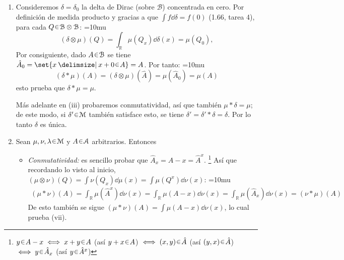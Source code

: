 \begin{sol}
\begin{enumerate}[label=(\roman*)]
{}
{\thickmuskip=10mu
\[
\abs{\mu*\nu} 
\leq {s_*(\mu^+ \otimes \nu^+)|_{\mathcal{B}}} + {s_*(\mu^- \otimes \nu^-)|_{\mathcal{B}}} + {s_*(\mu^+ \otimes \nu^-)|_{\mathcal{B}}} + s_*(\mu^- \otimes \nu^+)|_{\mathcal{B}}
\]}%
Al evaluar en $\mathbb{R}$ y aprovechar que $\hat{\mathbb{R}} = s^{-1}(\mathbb{R}) = \mathbb{R}\times\mathbb{R}$:
{\thickmuskip=10mu
\begin{align*}
\abs{\mu*\nu} (\mathbb{R})
&\leq (\mu^+\otimes\nu^+)(\mathbb{R}\times\mathbb{R}) + (\mu^-\otimes\nu^-)(\mathbb{R}\times\mathbb{R}) + (\mu^+\otimes\nu^-)(\mathbb{R}\times\mathbb{R}) + (\mu^-\otimes\nu^+)(\mathbb{R}\times\mathbb{R})\\
&= \mu^+(\hat{\mathbb{R}})\nu^+(\hat{\mathbb{R}}) + \mu^-(\hat{\mathbb{R}})\nu^-(\hat{\mathbb{R}}) + \mu^+(\hat{\mathbb{R}})\nu^-(\hat{\mathbb{R}}) + \mu^-(\hat{\mathbb{R}})\nu^+(\hat{\mathbb{R}})\\
&= (\mu^++\mu^-)(\mathbb{R})(\nu^++\nu^-)(\mathbb{R})
= \abs{\mu}(\mathbb{R})\abs{\nu}(\mathbb{R})
\end{align*}}%
es decir, $\norm{\mu*\nu} \le \norm{\mu}\norm{\nu}$.
\item %
Consideremos $\delta = \delta_0$ la delta de Dirac (sobre $\mathcal{B}$) concentrada en cero. Por definición de medida producto y gracias a que $\int f \dd{\delta} = f(0)$ (1.66, tarea 4), para cada $Q\en\mathcal{B}\otimes\mathcal{B}$:
{\thickmuskip=10mu
\[
(\delta\otimes\mu)(Q) 
= \int_{\mathbb{R}} \mu(Q_x) \dd{\delta(x)}
= \mu(Q_0),
\]}%
Por consiguiente, dado $A\en\mathcal{B}$ se tiene $\hat{A}_0 = \set{x \given x+0 \en A} = A$. Por tanto:
{\thickmuskip=10mu
\[
(\delta\ast\mu)(A) = (\delta\otimes\mu)(\hat{A}) = \mu(\hat{A}_0) = \mu(A)
\]}%
esto prueba que $\delta*\mu=\mu$.\par
Más adelante en (iii) probaremos conmutatividad, así que también $\mu*\delta = \mu$; de este modo, si $\delta'\en\mathcal{M}$ también satisface esto, se tiene $\delta'  = \delta' * \delta = \delta$. Por lo tanto $\delta$ es única.
\item %
Sean $\mu,\nu,\lambda\en\mathcal{M}$ y $A\en\mathcal{A}$ arbitrarios. Entonces
\begin{itemize}
\item\emph{Conmutatividad:} 
es sencillo probar que $\hat{A}_x = A-x = \hat{A}^x$.%
\footnote{
    $y\en A-x \iff x+y \en A$ (así $y+x\en{A}$) $\iff (x,y)\en\hat{A}$ (así $(y,x)\en\hat{A}$) $\iff y\en\hat{A}_x$ (así $y\en\hat{A}^x$)
}
Así que recordando lo visto al inicio, $(\mu\otimes\nu)(Q) = \int \nu(Q_x)\dd{\mu(x)} = \int\mu(Q^x)\dd{\nu(x)}$: 
{\thickmuskip=10mu
\begin{align*}
(\mu*\nu)(A)
= \int_{\mathbb{R}} \mu(\hat{A}^x) \dd{\nu(x)}
= \int_{\mathbb{R}} \mu(A-x) \dd{\nu(x)}
= \int_{\mathbb{R}} \mu(\hat{A}_x) \dd{\nu(x)}
= (\nu*\mu)(A)
\end{align*}}%
De esto también se sigue $(\mu*\nu)(A)=\int \mu(A-x) \dd{\nu(x)}$, lo cual prueba (vii).


\end{itemize}
\end{enumerate}
\end{sol}
